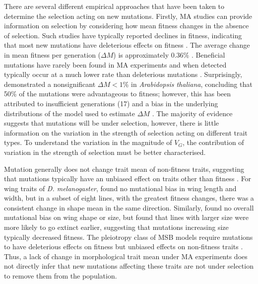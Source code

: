 There are several different empirical approaches that have been taken to determine the selection acting on new mutations. Firstly, MA studies can provide information on selection by considering how mean fitness changes in the absence of selection. Such studies have typically reported declines in fitness, indicating that most new mutations have deleterious effects on fitness \citep{Hall09}. The average change in mean fitness per generation (\( \Delta M \)) is approximately 0.36\% \citep{Hall09}. Beneficial mutations have rarely been found in MA experiments and when detected typically occur at a much lower rate than deleterious mutations \citep{Jose04}. Surprisingly, \citet{Shaw00} demonstrated a nonsignificant \( \Delta M \)$<1$\% in \textit{Arabidopsis thaliana}, concluding that 50\% of the mutations were advantageous to fitness; however, this has been attributed to insufficient generations (17) and a bias in the underlying distributions of the model used to estimate \( \Delta M \) \citep{Keig03}. The majority of evidence suggests that mutations will be under selection, however, there is little information on the variation in the strength of selection acting on different trait types. To understand the variation in the magnitude of $V_G$, the contribution of variation in the strength of selection must be better characterised. \par

Mutation generally does not change trait mean of non-fitness traits, suggesting that mutations typically have an unbiased effect on traits other than fitness \citep{John05}. For wing traits of \textit{D. melanogaster}, \citet{Sant92} found no mutational bias in wing length and width, but in a subset of eight lines, with the greatest fitness changes, there was a consistent change in shape mean in the same direction. Similarly, \citet{McGu13} found no overall mutational bias on wing shape or size, but found that lines with larger size were more likely to go extinct earlier, suggesting that mutations increasing size typically decreased fitness. The pleiotropy class of MSB models require mutations to have deleterious effects on fitness but unbiased effects on non-fitness traits \citep{Keig90, Wals18}. Thus, a lack of change in morphological trait mean under MA experiments does not directly infer that new mutations affecting these traits are not under selection to remove them from the population. \par
 
